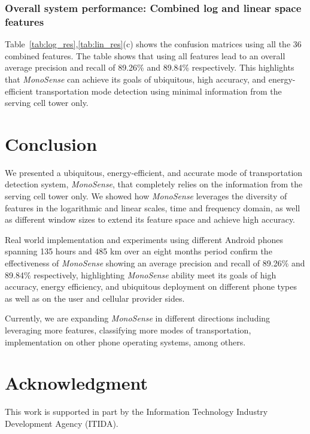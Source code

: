 \documentclass[conference]{IEEEtran}
\def \sys {\textit{MonoSense}}
\begin{document}
\subsubsection{Overall system performance: Combined log and linear space features}
\label{sec:combined_res}
Table~\ref{tab:log_res},\ref{tab:lin_res}(c)  shows the confusion matrices using all the 36 combined features. The table shows that using all features lead to an overall average precision and recall of 89.26\% and 89.84\% respectively. This highlights that \sys{} can achieve its goals of ubiquitous, high accuracy, and energy-efficient transportation mode detection using minimal information from the serving cell tower only.



\section{Conclusion}\label{Sec:conclusion}
We presented a ubiquitous, energy-efficient, and accurate mode of transportation detection system, \sys{}, that completely relies on the information from the serving cell tower only. We showed how \sys{} leverages the diversity of features in the logarithmic and linear scales, time and frequency domain, as well as different window sizes to extend its feature space and achieve high accuracy.

Real world implementation and experiments using different Android phones spanning 135 hours and 485 km over an eight months period confirm the effectiveness of \sys{} showing an average precision and recall of 89.26\% and 89.84\% respectively, highlighting \sys{} ability meet its goals of high accuracy, energy efficiency, and ubiquitous deployment on different phone types as well as on the user and cellular provider sides.

Currently, we are expanding \sys{} in different directions including leveraging more features, classifying more modes of transportation, implementation on other phone operating systems, among others.


\section*{Acknowledgment}
This work is supported in part by the Information Technology Industry Development Agency (ITIDA).





  



\end{document}
